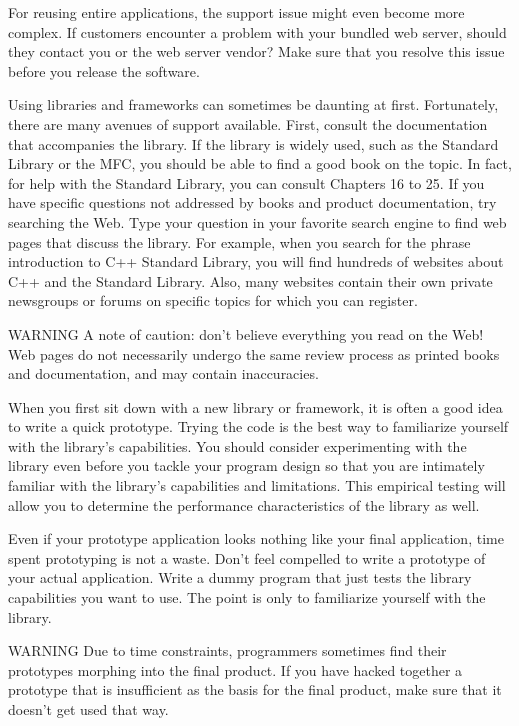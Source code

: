 For reusing entire applications, the support issue might even become more complex. If customers encounter a problem with your bundled web server, should they contact you or the web server vendor? Make sure that you resolve this issue before you release the software.

Using libraries and frameworks can sometimes be daunting at first. Fortunately, there are many avenues of support available. First, consult the documentation that accompanies the library. If the library is widely used, such as the Standard Library or the MFC, you should be able to find a good book on the topic. In fact, for help with the Standard Library, you can consult Chapters 16 to 25. If you have specific questions not addressed by books and product documentation, try searching the Web. Type your question in your favorite search engine to find web pages that discuss the library. For example, when you search for the phrase introduction to C++ Standard Library, you will find hundreds of websites about C++ and the Standard Library. Also, many websites contain their own private newsgroups or forums on specific topics for which you can register.

\begin{myWarning}{WARNING}
A note of caution: don’t believe everything you read on the Web! Web pages do not necessarily undergo the same review process as printed books and documentation, and may contain inaccuracies.
\end{myWarning}


When you first sit down with a new library or framework, it is often a good idea to write a quick prototype. Trying the code is the best way to familiarize yourself with the library’s capabilities. You should consider experimenting with the library even before you tackle your program design so that you are intimately familiar with the library’s capabilities and limitations. This empirical testing will allow you to determine the performance characteristics of the library as well.

Even if your prototype application looks nothing like your final application, time spent prototyping is not a waste. Don’t feel compelled to write a prototype of your actual application. Write a dummy program that just tests the library capabilities you want to use. The point is only to familiarize yourself with the library.

\begin{myWarning}{WARNING}
Due to time constraints, programmers sometimes find their prototypes morphing into the final product. If you have hacked together a prototype that is insufficient as the basis for the final product, make sure that it doesn’t get used that way.
\end{myWarning}

